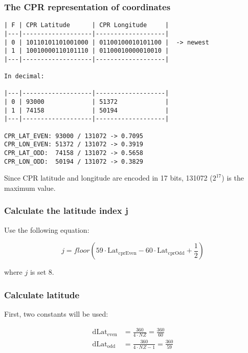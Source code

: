 \subsubsection{The CPR representation of
coordinates}\label{the-cpr-representation-of-coordinates}

\begin{verbatim}
| F | CPR Latitude      | CPR Longitude     |
|---|-------------------|-------------------|
| 0 | 10110101101001000 | 01100100010101100 |  -> newest
| 1 | 10010000110101110 | 01100010000010010 |
|---|-------------------|-------------------|

In decimal:

|---|-------------------|-------------------|
| 0 | 93000             | 51372             |
| 1 | 74158             | 50194             |
|---|-------------------|-------------------|

CPR_LAT_EVEN: 93000 / 131072 -> 0.7095
CPR_LON_EVEN: 51372 / 131072 -> 0.3919
CPR_LAT_ODD:  74158 / 131072 -> 0.5658
CPR_LON_ODD:  50194 / 131072 -> 0.3829
\end{verbatim}

Since CPR latitude and longitude are encoded in 17 bits, 131072 ($2^{17}$) is the maximum value.

\subsubsection{Calculate the latitude index j}\label{calculate-the-latitude-index-j}

Use the following equation:

\begin{equation}
  j = floor \left( 59 \cdot \mathrm{Lat}_\mathrm{cprEven} - 60 \cdot \mathrm{Lat}_\mathrm{cprOdd} + \frac{1}{2}  \right)
\end{equation}

\noindent where $j$ is set 8.

\subsubsection{Calculate latitude}\label{calculate-latitude}

First, two constants will be used:

\begin{equation}
  \begin{split}
    \mathrm{dLat}_\mathrm{even} &= \frac{360}{4 \cdot NZ} = \frac{360}{60} \\
    \mathrm{dLat}_\mathrm{odd} &= \frac{360}{4 \cdot NZ - 1}  = \frac{360}{59}
  \end{split}
\end{equation}

